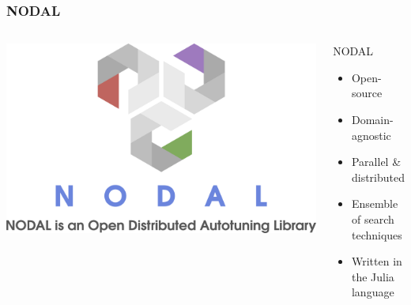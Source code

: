\documentclass[10pt, compress, aspectratio=169]{beamer}
\begin{document}
\begin{frame}
    \frametitle{NODAL}
    \begin{columns}[c]
        \begin{center}
            \includegraphics[width=\columnwidth]{logo}
        \end{center}

        \begin{block}{NODAL}
            \begin{itemize}
                \item \alert{Open-source}
                \item \alert{Domain-agnostic}
                \item \alert{Parallel \& distributed}
                \item \alert{Ensemble} of search techniques
                \item Written in the \alert{Julia language}
            \end{itemize}
        \end{block}

    \end{columns}
\end{frame}
\end{document}
